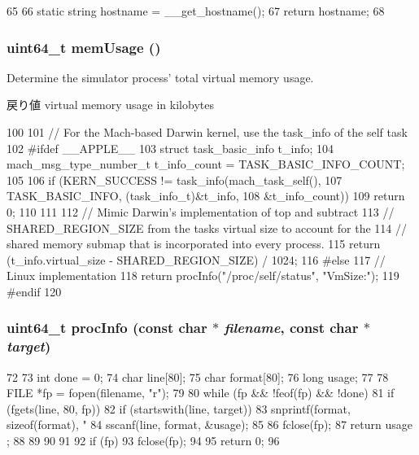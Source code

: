\begin{DoxyCode}
65 {
66     static string hostname = __get_hostname();
67     return hostname;
68 }
\end{DoxyCode}
\hypertarget{hostinfo_8hh_af25c7a8864229307a3f0523a45328c9b}{
\subsubsection[{memUsage}]{\setlength{\rightskip}{0pt plus 5cm}uint64\_\-t memUsage ()}}
\label{hostinfo_8hh_af25c7a8864229307a3f0523a45328c9b}
Determine the simulator process' total virtual memory usage.

\begin{DoxyReturn}{戻り値}
virtual memory usage in kilobytes 
\end{DoxyReturn}



\begin{DoxyCode}
100 {
101 // For the Mach-based Darwin kernel, use the task_info of the self task
102 #ifdef __APPLE__
103     struct task_basic_info t_info;
104     mach_msg_type_number_t t_info_count = TASK_BASIC_INFO_COUNT;
105 
106     if (KERN_SUCCESS != task_info(mach_task_self(),
107                                   TASK_BASIC_INFO, (task_info_t)&t_info,
108                                   &t_info_count)) {
109         return 0;
110     }
111 
112     // Mimic Darwin's implementation of top and subtract
113     // SHARED_REGION_SIZE from the tasks virtual size to account for the
114     // shared memory submap that is incorporated into every process.
115     return (t_info.virtual_size - SHARED_REGION_SIZE) / 1024;
116 #else
117     // Linux implementation
118     return procInfo("/proc/self/status", "VmSize:");
119 #endif
120 }
\end{DoxyCode}
\hypertarget{hostinfo_8hh_af828f458b0892e2778f8ffb6ed6f0610}{
\subsubsection[{procInfo}]{\setlength{\rightskip}{0pt plus 5cm}uint64\_\-t procInfo (const char $\ast$ {\em filename}, \/  const char $\ast$ {\em target})}}
\label{hostinfo_8hh_af828f458b0892e2778f8ffb6ed6f0610}



\begin{DoxyCode}
72 {
73     int  done = 0;
74     char line[80];
75     char format[80];
76     long usage;
77 
78     FILE *fp = fopen(filename, "r");
79 
80     while (fp && !feof(fp) && !done) {
81         if (fgets(line, 80, fp)) {
82             if (startswith(line, target)) {
83                 snprintf(format, sizeof(format), "%
84                 sscanf(line, format, &usage);
85 
86                 fclose(fp);
87                 return usage ;
88             }
89         }
90     }
91 
92     if (fp)
93         fclose(fp);
94 
95     return 0;
96 }
\end{DoxyCode}
